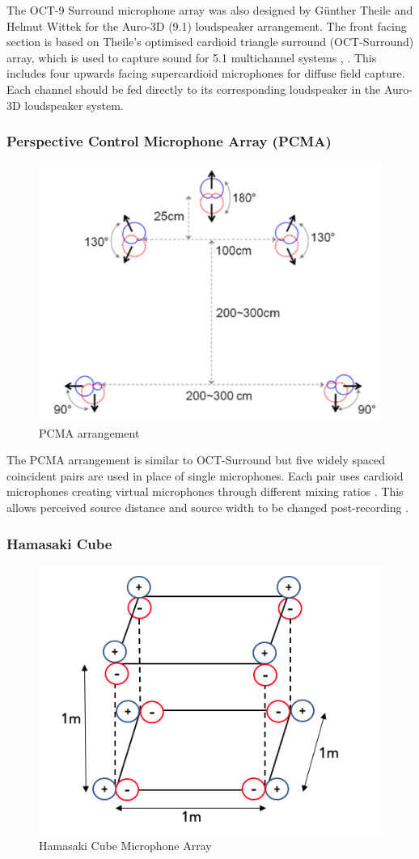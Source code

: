 			 The OCT-9 Surround microphone array was also designed by G\"{u}nther Theile and Helmut Wittek for the Auro-3D (9.1) loudspeaker arrangement. The front facing section is based on Theile's optimised cardioid triangle surround (OCT-Surround) array, which is used to capture sound for 5.1 multichannel systems \cite{TheileWittek}, \cite{Theile}. This includes four upwards facing supercardioid microphones for diffuse field capture. Each channel should be fed directly to its corresponding loudspeaker in the Auro-3D loudspeaker system.

		\subsubsection{Perspective Control Microphone Array (PCMA)}

			\begin{figure}[h!]
			\begin{center}
				\includegraphics[width = 0.5\linewidth]{images/mic/pcma.png}
				\caption{PCMA arrangement \cite{leePCMA}}
				\label{pcma}
			\end{center}
			\end{figure}
			The PCMA arrangement is similar to OCT-Surround but five widely spaced coincident pairs are used in place of single microphones. Each pair uses cardioid microphones creating virtual microphones through different mixing ratios \cite{leePCMA}. This allows perceived source distance and source width to be changed post-recording \cite{leePCMA}.

		\subsubsection{Hamasaki Cube}

			\begin{figure}[h!]
			\begin{center}
				\includegraphics[width = 0.5\linewidth]{images/mic/Hamasaki1.png}
				\caption{Hamasaki Cube Microphone Array}
				\label{ham}
			\end{center}
			\end{figure}

